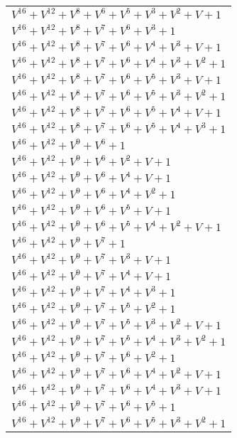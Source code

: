\documentclass[12pt]{article}
\begin{document}
\begin{adjustwidth}{-4cm}{}
\begin{center}
\begin{longtable}{|l|}
$V^{16}  +V^{12}  +V^{8}  +V^{6}  +V^{5}  +V^{3}  +V^{2}  + V + 1$ \\
$V^{16}  +V^{12}  +V^{8}  +V^{7}  +V^{6}  +V^{3}  + 1$ \\
$V^{16}  +V^{12}  +V^{8}  +V^{7}  +V^{6}  +V^{4}  +V^{3}  + V + 1$ \\
$V^{16}  +V^{12}  +V^{8}  +V^{7}  +V^{6}  +V^{4}  +V^{3}  +V^{2}  + 1$ \\
$V^{16}  +V^{12}  +V^{8}  +V^{7}  +V^{6}  +V^{5}  +V^{3}  + V + 1$ \\
$V^{16}  +V^{12}  +V^{8}  +V^{7}  +V^{6}  +V^{5}  +V^{3}  +V^{2}  + 1$ \\
$V^{16}  +V^{12}  +V^{8}  +V^{7}  +V^{6}  +V^{5}  +V^{4}  + V + 1$ \\
$V^{16}  +V^{12}  +V^{8}  +V^{7}  +V^{6}  +V^{5}  +V^{4}  +V^{3}  + 1$ \\
$V^{16}  +V^{12}  +V^{9}  +V^{6}  + 1$ \\
$V^{16}  +V^{12}  +V^{9}  +V^{6}  +V^{2}  + V + 1$ \\
$V^{16}  +V^{12}  +V^{9}  +V^{6}  +V^{4}  + V + 1$ \\
$V^{16}  +V^{12}  +V^{9}  +V^{6}  +V^{4}  +V^{2}  + 1$ \\
$V^{16}  +V^{12}  +V^{9}  +V^{6}  +V^{5}  + V + 1$ \\
$V^{16}  +V^{12}  +V^{9}  +V^{6}  +V^{5}  +V^{4}  +V^{2}  + V + 1$ \\
$V^{16}  +V^{12}  +V^{9}  +V^{7}  + 1$ \\
$V^{16}  +V^{12}  +V^{9}  +V^{7}  +V^{3}  + V + 1$ \\
$V^{16}  +V^{12}  +V^{9}  +V^{7}  +V^{4}  + V + 1$ \\
$V^{16}  +V^{12}  +V^{9}  +V^{7}  +V^{4}  +V^{3}  + 1$ \\
$V^{16}  +V^{12}  +V^{9}  +V^{7}  +V^{5}  +V^{2}  + 1$ \\
$V^{16}  +V^{12}  +V^{9}  +V^{7}  +V^{5}  +V^{3}  +V^{2}  + V + 1$ \\
$V^{16}  +V^{12}  +V^{9}  +V^{7}  +V^{5}  +V^{4}  +V^{3}  +V^{2}  + 1$ \\
$V^{16}  +V^{12}  +V^{9}  +V^{7}  +V^{6}  +V^{2}  + 1$ \\
$V^{16}  +V^{12}  +V^{9}  +V^{7}  +V^{6}  +V^{4}  +V^{2}  + V + 1$ \\
$V^{16}  +V^{12}  +V^{9}  +V^{7}  +V^{6}  +V^{4}  +V^{3}  + V + 1$ \\
$V^{16}  +V^{12}  +V^{9}  +V^{7}  +V^{6}  +V^{5}  + 1$ \\
$V^{16}  +V^{12}  +V^{9}  +V^{7}  +V^{6}  +V^{5}  +V^{3}  +V^{2}  + 1$ \\

\end{longtable}
\end{center}
\end{adjustwidth}
\end{document}
